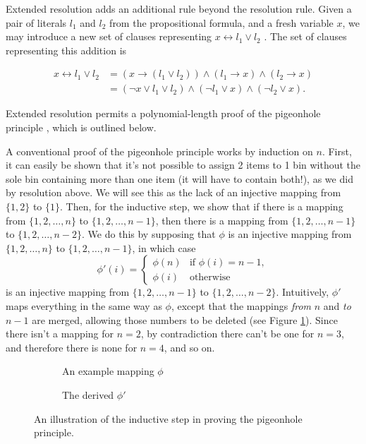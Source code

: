\documentclass[proof,pdftex,11pt,a4]{article}
\begin{document}
Extended resolution adds an additional rule beyond the resolution rule. Given a pair of literals $l_1$ and $l_2$ from the propositional formula, and a fresh variable $x$, we may introduce a new set of clauses representing $x \leftrightarrow l_1 \vee l_2$ \cite{Tseitin:1983}. The set of clauses representing this addition is

\begin{equation*}
  \begin{align*}
    x \leftrightarrow l_1 \vee l_2 &= (x \to (l_1 \vee l_2)) \wedge (l_1 \to x) \wedge (l_2 \to x) \\
          &= (\neg x \vee l_1 \vee l_2) \wedge (\neg l_1 \vee x) \wedge (\neg l_2 \vee x).
  \end{align*}
\end{equation*}

Extended resolution permits a polynomial-length proof of the pigeonhole principle \cite{Cook:1976}, which is outlined below.

A conventional proof of the pigeonhole principle works by induction on $n$. First, it can easily be shown that it's not possible to assign 2 items to 1 bin without the sole bin containing more than one item (it will have to contain both!), as we did by resolution above. We will see this as the lack of an injective mapping from $\{1,2\}$ to $\{1\}$. Then, for the inductive step, we show that if there is a mapping from $\{1,2,\ldots,n\}$ to $\{1,2,\ldots,n-1\}$, then there is a mapping from $\{1,2,\ldots,n-1\}$ to $\{1,2,\ldots,n-2\}$. We do this by supposing that $\phi$ is an injective mapping from $\{1,2,\ldots,n\}$ to $\{1,2,\ldots,n-1\}$, in which case
\[\phi'(i) = \begin{cases}
\phi(n) & \mbox{if } \phi(i) = n-1, \\
\phi(i) & \mbox{otherwise}
\end{cases}\]
is an injective mapping from $\{1,2,\ldots,n-1\}$ to $\{1,2,\ldots,n-2\}$. Intuitively, $\phi'$ maps everything in the same way as $\phi$, except that the mappings \emph{from} $n$ and \emph{to} $n-1$ are merged, allowing those numbers to be deleted (see Figure \ref{fig:php-induction}). Since there isn't a mapping for $n=2$, by contradiction there can't be one for $n=3$, and therefore there is none for $n=4$, and so on.

\begin{figure}[h]
  \begin{subfigure}[H]{0.5\textwidth}
    
    \caption{An example mapping $\phi$}
  \end{subfigure}
  \begin{subfigure}[H]{0.5\textwidth}
    
    \caption{The derived $\phi'$}
  \end{subfigure}
  \caption{An illustration of the inductive step in proving the pigeonhole principle.}
  \label{fig:php-induction}
\end{figure}
\end{document}
